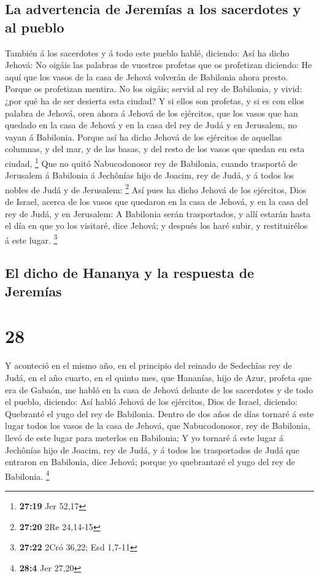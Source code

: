\hypertarget{la-advertencia-de-jeremuxedas-a-los-sacerdotes-y-al-pueblo}{%
\subsection{La advertencia de Jeremías a los sacerdotes y al
pueblo}\label{la-advertencia-de-jeremuxedas-a-los-sacerdotes-y-al-pueblo}}

 También á los sacerdotes y á todo este pueblo hablé,
diciendo: Así ha dicho Jehová: No oigáis las palabras de vuestros
profetas que os profetizan diciendo: He aquí que los vasos de la casa de
Jehová volverán de Babilonia ahora presto. Porque os profetizan mentira.
 No los oigáis; servid al rey de Babilonia, y vivid: ¿por
qué ha de ser desierta esta ciudad?  Y si ellos son
profetas, y si es con ellos palabra de Jehová, oren ahora á Jehová de
los ejércitos, que los vasos que han quedado en la casa de Jehová y en
la casa del rey de Judá y en Jerusalem, no vayan á Babilonia.
 Porque así ha dicho Jehová de los ejércitos de aquellas
columnas, y del mar, y de las basas, y del resto de los vasos que quedan
en esta ciudad, \footnote{\textbf{27:19} Jer 52,17}  Que no
quitó Nabucodonosor rey de Babilonia, cuando trasportó de Jerusalem á
Babilonia á Jechônías hijo de Joacim, rey de Judá, y á todos los nobles
de Judá y de Jerusalem: \footnote{\textbf{27:20} 2Re 24,14-15}
 Así pues ha dicho Jehová de los ejércitos, Dios de Israel,
acerca de los vasos que quedaron en la casa de Jehová, y en la casa del
rey de Judá, y en Jerusalem:  A Babilonia serán
trasportados, y allí estarán hasta el día en que yo los visitaré, dice
Jehová; y después los haré subir, y restituirélos á este lugar.
\footnote{\textbf{27:22} 2Cró 36,22; Esd 1,7-11}

\hypertarget{el-dicho-de-hananya-y-la-respuesta-de-jeremuxedas}{%
\subsection{El dicho de Hananya y la respuesta de
Jeremías}\label{el-dicho-de-hananya-y-la-respuesta-de-jeremuxedas}}

\hypertarget{section-27}{%
\section{28}\label{section-27}}

 Y aconteció en el mismo año, en el principio del reinado de
Sedechîas rey de Judá, en el año cuarto, en el quinto mes, que Hananías,
hijo de Azur, profeta que era de Gabaón, me habló en la casa de Jehová
delante de los sacerdotes y de todo el pueblo, diciendo: 
Así habló Jehová de los ejércitos, Dios de Israel, diciendo: Quebranté
el yugo del rey de Babilonia.  Dentro de dos años de días
tornaré á este lugar todos los vasos de la casa de Jehová, que
Nabucodonosor, rey de Babilonia, llevó de este lugar para meterlos en
Babilonia;  Y yo tornaré á este lugar á Jechônías hijo de
Joacim, rey de Judá, y á todos los trasportados de Judá que entraron en
Babilonia, dice Jehová; porque yo quebrantaré el yugo del rey de
Babilonia. \footnote{\textbf{28:4} Jer 27,20}

